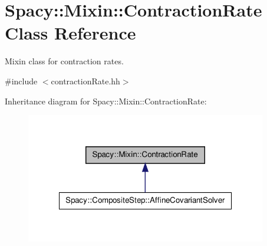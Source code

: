 \hypertarget{classSpacy_1_1Mixin_1_1ContractionRate}{\section{\-Spacy\-:\-:\-Mixin\-:\-:\-Contraction\-Rate \-Class \-Reference}
\label{classSpacy_1_1Mixin_1_1ContractionRate}
}


\-Mixin class for contraction rates.  




{\ttfamily \#include $<$contraction\-Rate.\-hh$>$}



\-Inheritance diagram for \-Spacy\-:\-:\-Mixin\-:\-:\-Contraction\-Rate\-:
\nopagebreak
\begin{figure}[H]
\begin{center}
\leavevmode
\includegraphics[width=298pt]{classSpacy_1_1Mixin_1_1ContractionRate__inherit__graph}
\end{center}
\end{figure}
